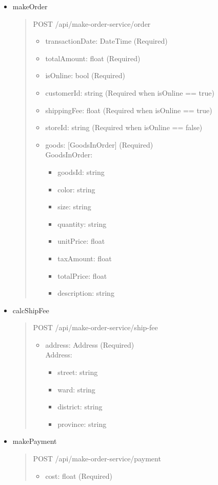 \begin{itemize}
	\item makeOrder
	      \begin{quote}
		      POST /api/make-order-service/order
		      \begin{itemize}
			      \item transactionDate: DateTime (Required)
			      \item totalAmount: float (Required)
			      \item isOnline: bool (Required)
			      \item customerId: string (Required when isOnline == true)
			      \item shippingFee: float (Required when isOnline == true)
			      \item storeId: string (Required when isOnline == false)
			      \item goods: [GoodsInOrder] (Required)\\
			            GoodsInOrder:
			            \begin{itemize}
				            \item goodsId: string
				            \item color: string
				            \item size: string
				            \item quantity: string
				            \item unitPrice: float
				            \item taxAmount: float
				            \item totalPrice: float
				            \item description: string
			            \end{itemize}
		      \end{itemize}
	      \end{quote}
	\item calcShipFee
	      \begin{quote}
		      POST /api/make-order-service/ship-fee
		      \begin{itemize}
			      \item address: Address (Required)\\
			            Address:
			            \begin{itemize}
				            \item street: string
				            \item ward: string
				            \item district: string
				            \item province: string
			            \end{itemize}
		      \end{itemize}
	      \end{quote}
	\item makePayment
	      \begin{quote}
		      POST /api/make-order-service/payment
		      \begin{itemize}
			      \item cost: float (Required)
		      \end{itemize}
	      \end{quote}
\end{itemize}

